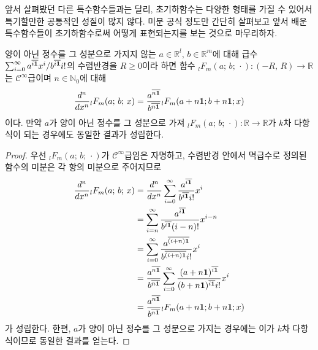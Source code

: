 앞서 살펴봤던 다른 특수함수들과는 달리, 초기하함수는 다양한 형태를 가질 수 있어서 특기할만한 공통적인 성질이 많지 않다. 미분 공식 정도만 간단히 살펴보고 앞서 배운 특수함수들이 초기하함수로써 어떻게 표현되는지를 보는 것으로 마무리하자.

\begin{theorem}
    양이 아닌 정수를 그 성분으로 가지지 않는 $a\in\mathbb{R}^l,\,b\in\mathbb{R}^m$에 대해 급수 $\sum_{i=0}^\infty a^{\overline{i\mathbf{1}}}x^i/b^{\overline{i\mathbf{1}}}i!$의 수렴반경을 $R\geq0$이라 하면 함수 $_lF_m(a;\,b;\,\cdot):(-R,\,R)\to\mathbb{R}$는 $\mathcal{C}^\infty$급이며 $n\in\mathbb{N}_0$에 대해
    \begin{equation*}
        \frac{d^n}{dx^n}{}_lF_m(a;\,b;\,x)=\frac{a^{\overline{n\mathbf{1}}}}{b^{\overline{n\mathbf{1}}}}{}_lF_m(a+n\mathbf{1};b+n\mathbf{1};x)
    \end{equation*}
    이다. 만약 $a$가 양이 아닌 정수를 그 성분으로 가져 $_lF_m(a;\,b;\,\cdot):\mathbb{R}\to\mathbb{R}$가 $k$차 다항식이 되는 경우에도 동일한 결과가 성립한다.
\end{theorem}

\begin{proof}
    우선 $_lF_m(a;\,b;\,\cdot)$가 $\mathcal{C}^\infty$급임은 자명하고, 수렴반경 안에서 멱급수로 정의된 함수의 미분은 각 항의 미분으로 주어지므로
    \begin{align*}
        \frac{d^n}{dx^n}{}_lF_m(a;\,b;\,x)&=\frac{d^n}{dx^n}\sum_{i=0}^\infty\frac{a^{\overline{i\mathbf{1}}}}{b^{\overline{i\mathbf{1}}}i!}x^i\\
        &=\sum_{i=n}^\infty\frac{a^{\overline{i\mathbf{1}}}}{b^{\overline{i\mathbf{1}}}(i-n)!}x^{i-n}\\
        &=\sum_{i=0}^\infty\frac{a^{\overline{(i+n)\mathbf{1}}}}{b^{\overline{(i+n)\mathbf{1}}}i!}x^i\\
        &=\frac{a^{\overline{n\mathbf{1}}}}{b^{\overline{n\mathbf{1}}}}\sum_{i=0}^\infty\frac{(a+n\mathbf{1})^{\overline{i\mathbf{1}}}}{(b+n\mathbf{1})^{\overline{i\mathbf{1}}}i!}x^i\\
        &=\frac{a^{\overline{n\mathbf{1}}}}{b^{\overline{n\mathbf{1}}}}{}_lF_m(a+n\mathbf{1};b+n\mathbf{1};x)
    \end{align*}
    가 성립한다. 한편, $a$가 양이 아닌 정수를 그 성분으로 가지는 경우에는 이가 $k$차 다항식이므로 동일한 결과를 얻는다.
\end{proof}

